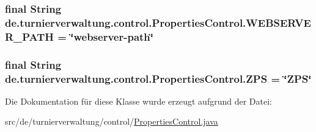 \subsubsection[{\texorpdfstring{W\+E\+B\+S\+E\+R\+V\+E\+R\+\_\+\+P\+A\+TH}{WEBSERVER_PATH}}]{\setlength{\rightskip}{0pt plus 5cm}final String de.\+turnierverwaltung.\+control.\+Properties\+Control.\+W\+E\+B\+S\+E\+R\+V\+E\+R\+\_\+\+P\+A\+TH = \char`\"{}webserver-\/path\char`\"{}\hspace{0.3cm}{\ttfamily [static]}}\hypertarget{classde_1_1turnierverwaltung_1_1control_1_1_properties_control_a2788458e7f7dbb585a6ce34b379cedd6}{}\label{classde_1_1turnierverwaltung_1_1control_1_1_properties_control_a2788458e7f7dbb585a6ce34b379cedd6}
\subsubsection[{\texorpdfstring{Z\+PS}{ZPS}}]{\setlength{\rightskip}{0pt plus 5cm}final String de.\+turnierverwaltung.\+control.\+Properties\+Control.\+Z\+PS = \char`\"{}Z\+PS\char`\"{}\hspace{0.3cm}{\ttfamily [static]}}\hypertarget{classde_1_1turnierverwaltung_1_1control_1_1_properties_control_aa8808b693c7a05ea88bf60f5b2f6697e}{}\label{classde_1_1turnierverwaltung_1_1control_1_1_properties_control_aa8808b693c7a05ea88bf60f5b2f6697e}


Die Dokumentation für diese Klasse wurde erzeugt aufgrund der Datei\+:\begin{DoxyCompactItemize}
\item 
src/de/turnierverwaltung/control/\hyperlink{_properties_control_8java}{Properties\+Control.\+java}\end{DoxyCompactItemize}
